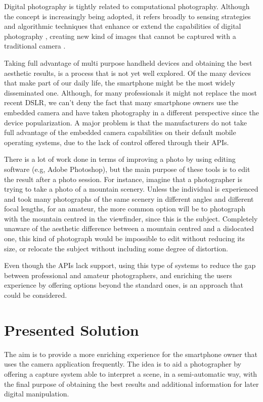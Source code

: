 Digital photography is tightly related to computational photography. Although the concept is increasingly being adopted, it refers broadly to sensing strategies and algorithmic techniques that enhance or extend the capabilities of digital photography \cite{Szeliski2012} , creating new kind of images that cannot be captured with a traditional camera \cite{Pulli}. 

Taking full advantage of multi purpose handheld devices and obtaining the best aesthetic results, is a process that is not yet well explored. 
Of the many devices that make part of our daily life, the smartphone might be the most widely disseminated one. Although, for many professionals it might not replace the most recent DSLR, we can't deny the fact that many smartphone owners use the embedded camera and have taken photography in a different perspective since the device popularization. A major problem is that the manufacturers do not take full advantage of the embedded camera capabilities on their default mobile operating systems, due to the lack of control offered through their APIs.

There is a lot of work done in terms of improving a photo by using editing software (e.g, Adobe Photoshop), but the main purpose of these tools is to edit the result after a photo session. For instance, imagine that a photographer is trying to take a photo of a mountain scenery. Unless the individual is experienced and took many photographs of the same scenery in different angles and different focal lengths, for an amateur, the more common option will be to photograph with the mountain centred in the viewfinder, since this is the subject. Completely unaware of the aesthetic difference between a mountain centred and a dislocated one, this kind of photograph would be impossible to edit without reducing its size, or relocate the subject without including some degree of distortion.

Even though the APIs lack  support, using this type of systems to reduce the gap between professional and amateur photographers, and enriching the users experience by offering options beyond the standard ones, is an approach that could be considered.

\section{Presented Solution}

The aim is to provide a more enriching experience for the smartphone owner that uses the camera application frequently. The idea is to aid a photographer by offering a capture system able to interpret a scene, in a semi-automatic way, with the final purpose of obtaining the best results and additional information for later digital manipulation.

